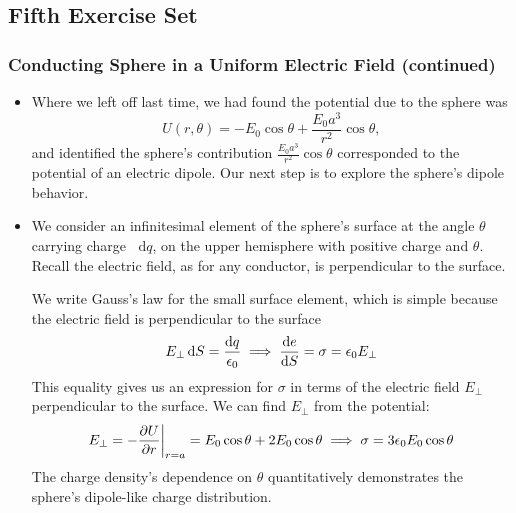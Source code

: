 \documentclass[11pt, a4paper]{article}
\newcommand{\diff}{\mathop{}\!\mathrm{d}} %
\newcommand{\ee}{\epsilon_{0}}  %
\begin{document}
\subsection{Fifth Exercise Set}

\subsubsection{Conducting Sphere in a Uniform Electric Field (continued)}
\begin{itemize}
	\item Where we left off last time, we had found the potential due to the sphere was
	\begin{equation*}
		U(r, \theta) = - E_{0} \cos \theta + \frac{E_{0}a^{3}}{r^{2}}\cos \theta,
	\end{equation*}
	and identified the sphere's contribution $ \frac{E_{0}a^{3}}{r^{2}}\cos \theta $ corresponded to the potential of an electric dipole. Our next step is to explore the sphere's dipole behavior.
	
	\item We consider an infinitesimal element of the sphere's surface at the angle $ \theta $ carrying charge $ \diff q $, on the upper hemisphere with positive charge and $ \theta $. Recall the electric field, as for any conductor, is perpendicular to the surface. 
	
	We write Gauss's law for the small surface element, which is simple because the electric field is perpendicular to the surface
	\begin{equation*}
		E_{\perp} \diff S = \frac{\diff q}{\ee} \implies \dv{e}{S} = \sigma = \ee E_{\perp}
	\end{equation*}
	This equality gives us an expression for $ \sigma $ in terms of the electric field $ E_{\perp} $ perpendicular to the surface. We can find $ E_{\perp} $ from the potential:
	\begin{equation*}
		E_{\perp} = -\pdv{U}{r}\bigg |_{r = a} = E_{0}\cos \theta + 2E_{0}\cos \theta \implies \sigma = 3\ee E_{0} \cos \theta
	\end{equation*}
	The charge density's dependence on $ \theta $ quantitatively demonstrates the sphere's dipole-like charge distribution. 
	

\end{itemize}
\end{document}

